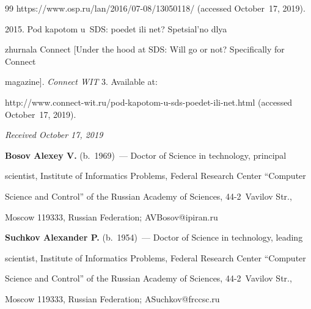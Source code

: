{{\begin{thebibliography}{99}
{\sf https://www.osp.ru/lan/2016/07-08/13050118/} (accessed October~17, 2019).




 2015. Pod kapotom u~SDS: poedet ili net? Spetsial'no dlya 


zhurnala Connect [Under the hood at SDS: Will go or not? Specifically for Connect 


magazine]. \textit{Connect WIT} 3. Available at: 


{\sf http://www.connect-wit.ru/pod-kapotom-u-sds-poedet-ili-net.html} (accessed October~17, 2019).





\end{thebibliography}


} }













\hfill{\small\textit{Received October 17, 2019}} 



















\Contr





\noindent


\textbf{Bosov Alexey V.} (b.\ 1969)~--- Doctor of Science in technology, principal 


scientist, Institute of Informatics Problems, Federal Research Center ``Computer 


Science and Control'' of the Russian Academy of Sciences, 44-2~Vavilov Str., 


Moscow 119333, Russian Federation; \mbox{AVBosov@ipiran.ru}





\vspace*{3pt}


\noindent


\textbf{Suchkov Alexander P.} (b.\ 1954)~--- Doctor of Science in technology, leading 


scientist, Institute of Informatics Problems, Federal Research Center ``Computer 


Science and Control'' of the Russian Academy of Sciences, 44-2~Vavilov Str., 


Moscow 119333, Russian Federation; \mbox{ASuchkov@frccsc.ru}


\label{end\stat}





\renewcommand{\bibname}{\protect\rm Литература} 


